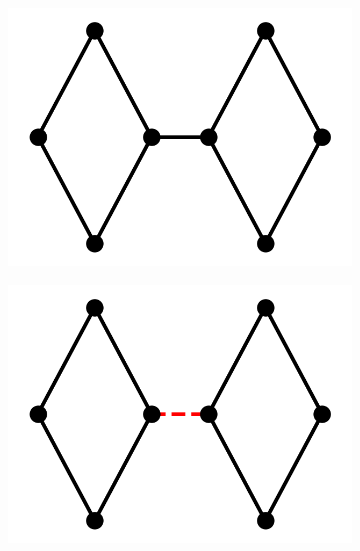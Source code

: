 \begin{figure}[H]
    \begin{center}
        \begin{subfigure}[b]{0.3\textwidth}
            \includegraphics[width=\textwidth]{img/3/1}
            \caption{}
            \label{}
        \end{subfigure}
        \begin{subfigure}[b]{0.3\textwidth}
            \includegraphics[width=\textwidth]{img/3/dashed}
            \caption{}
            \label{}
        \end{subfigure}
        \begin{subfigure}[b]{0.3\textwidth}

\end{subfigure}
\end{center}
\end{figure}
